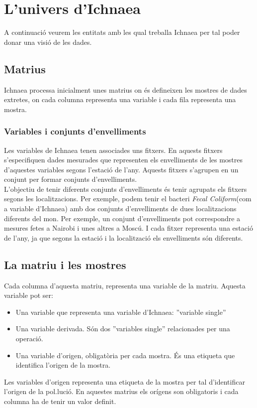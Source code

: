\section{L'univers d'Ichnaea}
A continuaci\'{o} veurem les entitats amb les qual treballa Ichnaea per tal poder donar una visi\'{o} de les dades.

\subsection{Matrius}
\label{cha:backgroud:univers:matrius}
Ichnaea processa inicialment unes matrius on \'e{s} defineixen les mostres de dades extretes, on cada columna representa una variable i cada fila representa una mostra. 

\subsubsection{Variables i conjunts d'envelliments}
\label{cha:backgroud:univers:matrius:variables_seasons}
Les variables de Ichnaea tenen associades uns fitxers. En aquests fitxers s'especifiquen dades mesurades que representen els envelliments de les mostres d'aquestes variables segons l'estació de l'any. Aquests fitxers s'agrupen en un conjunt per formar conjunts d'envelliments.\\

L'objectiu de tenir diferents conjunts d'envelliments \'{e}s tenir agrupats els fitxers segons les localitzacions. Per exemple, podem tenir el bacteri \textit{Fecal Coliform}(com a variable d'Ichnaea) amb dos conjunts d'envelliments de dues localitzacions diferents del mon. Per exemple, un conjunt d'envelliments pot correspondre a mesures fetes a Nairobi i unes altres a Mosc\'{u}. I cada fitxer representa una estaci\'{o} de l'any, ja que segons la estaci\'{o} i la localitzaci\'{o} els envelliments s\'{o}n diferents.\\

\subsection{La matriu i les mostres}
Cada columna d'aquesta matriu, representa una variable de la matriu. Aquesta variable pot ser:\\
\begin{itemize}
\item Una variable que representa una variable d'Ichnaea: ''variable single''
\item Una variable derivada. S\'{o}n dos ''variables single'' relacionades per una operaci\'{o}.
\item Una variable d'origen, obligatòria per cada mostra. \'{E}s una etiqueta que identifica l'origen de la mostra.
\end{itemize}
Les variables d'origen representa una etiqueta de la mostra per tal d'identificar l'origen de la pol.luci\'{o}. En aquestes matrius els orígens son obligatoris i cada columna ha de tenir un valor definit.\\

